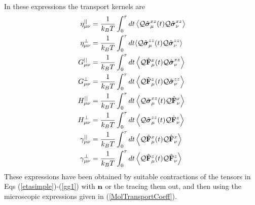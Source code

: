 \documentclass[b5paper,openright,11pt]{book}
\begin{document}
In these expressions the transport kernels are
\begin{align}
\eta^{||}_{\mu\nu}&
=\frac{1}{k_BT}\int_0^\tau  dt\left\langle 
{\cal Q}\hat{\boldsymbol{\sigma}}^{xz}_\mu(t){\cal Q}\hat{\boldsymbol{\sigma}}^{xz}_\nu
\right\rangle
\nonumber\\
\eta^{\bot}_{\mu\nu}&
= \frac{1}{k_BT}\int_0^\tau  dt\langle 
{\cal Q}\hat{\boldsymbol{\sigma}}^{zz}_\mu(t)
{\cal Q}\hat{\boldsymbol{\sigma}}^{zz}_\nu\rangle
\nonumber\\
G^{||}_{\mu\nu}&
=\frac{1}{k_BT} \int_0^\tau  dt
\left\langle{\cal Q}\hat{\bf F}^{x}_\mu(t)
{\cal Q}\hat{\boldsymbol{\sigma}}^{xz}_\nu
\right\rangle
\nonumber\\
G^{\bot}_{\mu\nu}&=\frac{1}{k_BT} \int_0^\tau  dt
\left\langle {\cal Q}\hat{\bf F}^{z}_\mu(t)
{\cal Q}\hat{\boldsymbol{\sigma}}^{zz}_\nu
\right\rangle
\nonumber\\
H^{||}_{\mu\nu}&
=\frac{1}{k_BT} 
\int_0^\tau  dt
\left\langle{\cal Q}\hat{\boldsymbol{\sigma}}^{xz}_\mu(t){\cal Q}\hat{\bf F}^{x}_\nu\right\rangle
\nonumber\\
H^\bot_{\mu\nu}&=\frac{1}{k_BT} 
\int_0^\tau  dt\left\langle {\cal Q}\hat{\boldsymbol{\sigma}}^{zz}_\mu(t){\cal Q}\hat{\bf F}^{z}_\nu\right\rangle
\nonumber\\
\gamma^{||}_{\mu\nu}&=
\frac{1}{k_BT} \int_0^\tau  dt
\left\langle 
{\cal Q}\hat{\bf F}^{x}_\mu(t)
{\cal Q}\hat{\bf F}^{x}_\nu\right\rangle
\nonumber\\
\gamma^{\bot}_{\mu\nu}&=
\frac{1}{k_BT} \int_0^\tau  dt\left\langle 
{\cal Q}\hat{\bf F}^{z}_\mu(t){\cal Q}\hat{\bf F}^{z}_\nu
\right\rangle
\label{summary_munu}
\end{align}
These expressions have  been obtained by suitable  contractions of the
tensors  in Eqs  (\ref{etasimple})-(\ref{gg1})  with ${\bf  n}$ or  the
tracing them out, and then  using the microscopic expressions given in
(\ref{MolTransportCoeff}).
\end{document}
